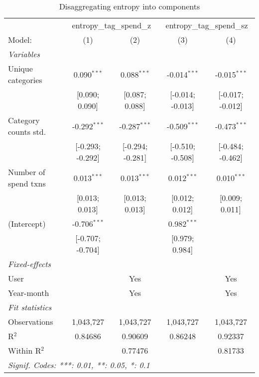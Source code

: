 
\begin{table}[htbp]
   \centering
   \tiny
   \begin{threeparttable}[b]
      \caption{\label{tab:reg_entropy_comp} Disaggregating entropy into components}
      \begin{tabular}{lcccc}
         \tabularnewline \midrule \midrule
          & \multicolumn{2}{c}{entropy\_tag\_spend\_z} & \multicolumn{2}{c}{entropy\_tag\_spend\_sz} \\ 
         Model:               & (1)              & (2)              & (3)              & (4)\\  
         \midrule
         \emph{Variables}\\
         Unique categories    & 0.090$^{***}$    & 0.088$^{***}$    & -0.014$^{***}$   & -0.015$^{***}$\\   
                              & [0.090; 0.090]   & [0.087; 0.088]   & [-0.014; -0.013] & [-0.017; -0.012]\\   
         Category counts std. & -0.292$^{***}$   & -0.287$^{***}$   & -0.509$^{***}$   & -0.473$^{***}$\\   
                              & [-0.293; -0.292] & [-0.294; -0.281] & [-0.510; -0.508] & [-0.484; -0.462]\\   
         Number of spend txns & 0.013$^{***}$    & 0.013$^{***}$    & 0.012$^{***}$    & 0.010$^{***}$\\   
                              & [0.013; 0.013]   & [0.013; 0.013]   & [0.012; 0.012]   & [0.009; 0.011]\\   
         (Intercept)          & -0.706$^{***}$   &                  & 0.982$^{***}$    &   \\   
                              & [-0.707; -0.704] &                  & [0.979; 0.984]   &   \\   
         \midrule
         \emph{Fixed-effects}\\
         User                 &                  & Yes              &                  & Yes\\  
         Year-month           &                  & Yes              &                  & Yes\\  
         \midrule
         \emph{Fit statistics}\\
         Observations         & 1,043,727        & 1,043,727        & 1,043,727        & 1,043,727\\  
         R$^2$                & 0.84686          & 0.90609          & 0.86248          & 0.92337\\  
         Within R$^2$         &                  & 0.77476          &                  & 0.81733\\  
         \midrule \midrule
         \multicolumn{5}{l}{\emph{Signif. Codes: ***: 0.01, **: 0.05, *: 0.1}}\\
      \end{tabular}
   \end{threeparttable}
\end{table}


